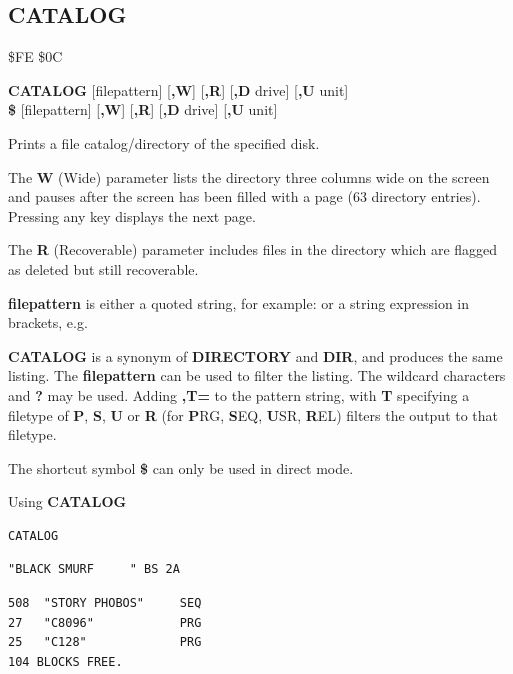 \subsection{CATALOG}
\begin{description}[leftmargin=2cm,style=nextline]
\item [Token:]  \$FE \$0C
\item [Format:] {\bf CATALOG} [filepattern] [{\bf,W}] [{\bf,R}]
		[{\bf,D} drive] [{\bf,U} unit] \\
		{\bf\$} [filepattern] [{\bf,W}] [{\bf,R}]
		[{\bf,D} drive] [{\bf,U} unit]
\item [Usage:]  Prints a file catalog/directory of the specified disk.

   The {\bf W} (Wide) parameter lists the directory three columns wide
   on the screen and pauses after the screen has been filled with a page
   (63 directory entries). Pressing any key displays the next page.

   The {\bf R} (Recoverable) parameter includes files in the
   directory which are flagged as deleted but still
   recoverable.

   {\bf filepattern} is either a quoted string, for example:  or
   a string expression in brackets, e.g. 

   \drivedefinition

   \unitdefinition

\item [Remarks:]
   {\bf CATALOG} is a synonym of {\bf DIRECTORY}
   and {\bf DIR}, and produces the same listing.
   The {\bf filepattern} can be used to filter the listing.
   The wildcard characters {\bf *} and {\bf ?} may be used.
   Adding {\bf ,T=} to the pattern string, with {\bf T} specifying
   a filetype of {\bf P}, {\bf S}, {\bf U} or {\bf R}
   (for {\bf P}RG, {\bf S}EQ, {\bf U}SR, {\bf R}EL) filters the
   output to that filetype.

   The shortcut symbol {\bf \$} can only be used in direct mode.

\item [Examples:] Using {\bf CATALOG}

\begin{tcolorbox}[colback=black,coltext=white]
\verbatimfont{\codefont}
\begin{verbatim}
CATALOG
\end{verbatim}
\selectfont{\codefont 0}
\begin{tcolorbox}[colback=white,coltext=black,arc=0mm,boxrule=0mm,
       left*=0.5mm,right*=0mm,top=0mm,bottom=0mm,nobeforeafter,
       left skip=0.5mm,
       width=28mm,height=3mm,valign=center]
\begin{verbatim}
"BLACK SMURF     " BS 2A
\end{verbatim}
\end{tcolorbox}
\begin{verbatim}
508  "STORY PHOBOS"     SEQ
27   "C8096"            PRG
25   "C128"             PRG
104 BLOCKS FREE.
\end{verbatim}
\end{tcolorbox}


\end{description}
